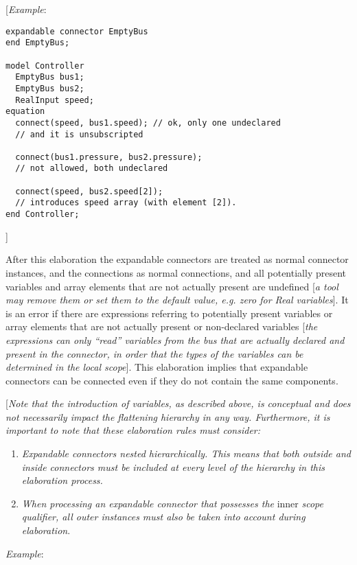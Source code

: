 {[}\emph{Example}:
\begin{lstlisting}[language=modelica]
expandable connector EmptyBus
end EmptyBus;

model Controller
  EmptyBus bus1;
  EmptyBus bus2;
  RealInput speed;
equation
  connect(speed, bus1.speed); // ok, only one undeclared
  // and it is unsubscripted

  connect(bus1.pressure, bus2.pressure);
  // not allowed, both undeclared

  connect(speed, bus2.speed[2]);
  // introduces speed array (with element [2]).
end Controller;
\end{lstlisting}
{]}

After this elaboration the expandable connectors are treated as normal
connector instances, and the connections as normal connections, and all
potentially present variables and array elements that are not actually
present are undefined {[}\emph{a tool may remove them or set them to the
default value, e.g. zero for Real variables}{]}. It is an error if there
are expressions referring to potentially present variables or array
elements that are not actually present or non-declared variables
{[}\emph{the expressions can only ``read'' variables from the bus that
are actually declared and present in the connector, in order that the
types of the variables can be determined in the local scope}{]}. This
elaboration implies that expandable connectors can be connected even if
they do not contain the same components.

{[}\emph{Note that the introduction of variables, as described above, is
conceptual and does not necessarily impact the flattening hierarchy in
any way. Furthermore, it is important to note that these elaboration
rules must consider:}

\begin{enumerate}
\item \emph{Expandable connectors nested hierarchically. This means that
both outside and inside connectors must be included at every level of
the hierarchy in this elaboration process.}
\item \emph{When processing an expandable connector that possesses the}
inner \emph{scope qualifier, all outer instances must also be taken into
account during elaboration}.
\end{enumerate}
\emph{Example}:

